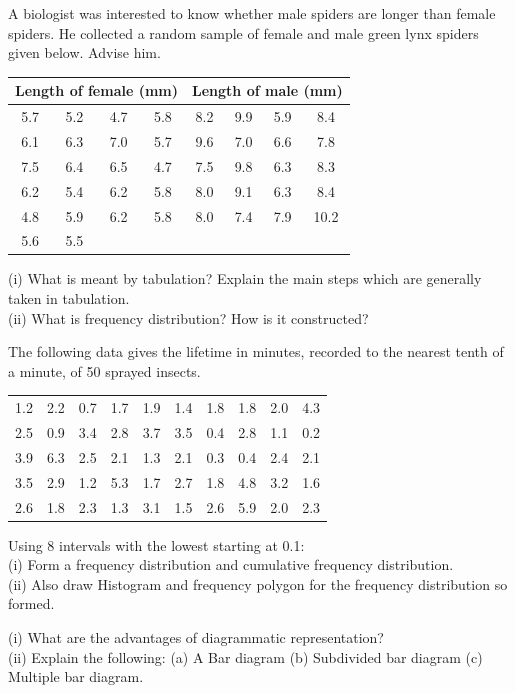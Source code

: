 \documentclass[11pt,a4paper]{article}
\begin{document}
\begin{longlist}
\item A biologist was interested to know whether male spiders are longer than female spiders. He collected a random sample of female and male green lynx spiders given below. Advise him.
\begin{center}
\begin{tabular}{cccc|cccc}
\multicolumn{4}{c|}{Length of female (mm)} & \multicolumn{4}{c}{Length of male (mm)} \\
\hline
5.7 & 5.2 & 4.7 & 5.8 & 8.2 & 9.9 & 5.9 & 8.4 \\
6.1 & 6.3 & 7.0 & 5.7 & 9.6 & 7.0 & 6.6 & 7.8 \\
7.5 & 6.4 & 6.5 & 4.7 & 7.5 & 9.8 & 6.3 & 8.3 \\
6.2 & 5.4 & 6.2 & 5.8 & 8.0 & 9.1 & 6.3 & 8.4 \\
4.8 & 5.9 & 6.2 & 5.8 & 8.0 & 7.4 & 7.9 & 10.2 \\
5.6 & 5.5 & & & & & &
\end{tabular}
\end{center}

\item [13.] (i) What is meant by tabulation? Explain the main steps which are generally taken in tabulation.\\
(ii) What is frequency distribution? How is it constructed?

\item The following data gives the lifetime in minutes, recorded to the nearest tenth of a minute, of 50 sprayed insects.
\begin{center}
\begin{tabular}{cccccccccc}
1.2 & 2.2 & 0.7 & 1.7 & 1.9 & 1.4 & 1.8 & 1.8 & 2.0 & 4.3 \\
2.5 & 0.9 & 3.4 & 2.8 & 3.7 & 3.5 & 0.4 & 2.8 & 1.1 & 0.2 \\
3.9 & 6.3 & 2.5 & 2.1 & 1.3 & 2.1 & 0.3 & 0.4 & 2.4 & 2.1 \\
3.5 & 2.9 & 1.2 & 5.3 & 1.7 & 2.7 & 1.8 & 4.8 & 3.2 & 1.6 \\
2.6 & 1.8 & 2.3 & 1.3 & 3.1 & 1.5 & 2.6 & 5.9 & 2.0 & 2.3
\end{tabular}
\end{center}
Using 8 intervals with the lowest starting at 0.1:\\
(i) Form a frequency distribution and cumulative frequency distribution.\\
(ii) Also draw Histogram and frequency polygon for the frequency distribution so formed.

\item [15.] (i) What are the advantages of diagrammatic representation?\\
(ii) Explain the following: (a) A Bar diagram (b) Subdivided bar diagram (c) Multiple bar diagram.


\end{longlist}
\end{document}
